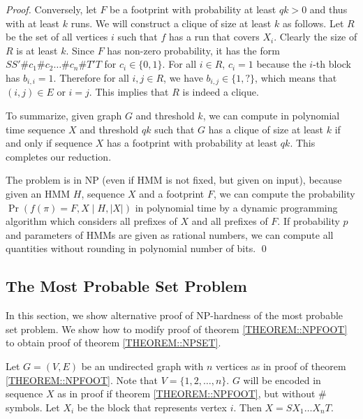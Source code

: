 \begin{proof}
Conversely, let $F$ be a footprint with probability at least $qk>0$
and thus with at least $k$ runs. We will construct a clique of size at
least $k$ as follows. Let $R$ be the set of all vertices $i$ such that
$f$ has a run that covers $X_i$. Clearly the size of $R$ is at least
$k$.  Since $F$ has non-zero probability, it has the form
$SS'\#c_1\#c_2\dots\#c_n\#T'T$ for $c_i\in \{0,1\}$. For all $i\in R$,
$c_i=1$ because the $i$-th block has $b_{i,i}=1$. Therefore for all
$i,j\in R$, we have $b_{i,j}\in \{1,?\}$, which means that $(i,j)\in
E$ or $i=j$. This implies that $R$ is indeed a clique.

To summarize, given graph $G$ and threshold $k$, we can compute in
polynomial time sequence $X$ and threshold $qk$ such that $G$ has a
clique of size at least $k$ if and only if sequence $X$ has a
footprint with probability at least $qk$. This completes our reduction.

The problem is in NP (even if HMM is not fixed, but given on input),
because given an HMM $H$, sequence $X$ and a footprint $F$, we can
compute the probability $\Pr(f(\pi)=F,X\mid H,|X|)$ in polynomial time
by a dynamic programming algorithm which considers all prefixes of
$X$ and all prefixes of $F$. If probability $p$ and parameters of HMMs
are given as rational numbers, we can compute all quantities without
rounding in polynomial number of bits. \qed
\end{proof}

\subsection{The Most Probable Set Problem}
In this section, we show alternative proof of NP-hardness of the most
probable set problem. We show how to modify proof of theorem \ref{THEOREM::NPFOOT}
to obtain proof of theorem \ref{THEOREM::NPSET}.

Let $G=(V,E)$ be an undirected graph with $n$ vertices as in proof of theorem
\ref{THEOREM::NPFOOT}. Note that $V = \{1, 2, \dots, n\}$. $G$ will be encoded in
sequence $X$ as in proof if theorem \ref{THEOREM::NPFOOT}, but without $\#$ symbols.
Let $X_i$ be the block that represents vertex $i$. Then $X=SX_1\dots X_nT$.

